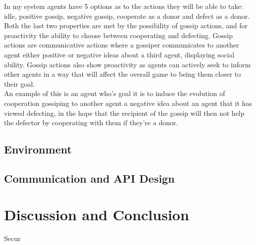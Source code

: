 \documentclass[twoside,twocolumn]{article}
\begin{document}
In my system agents have 5 options as to the actions they will be able to take: idle, positive gossip, negative gossip, cooperate as a donor and defect as a donor. Both the last two properties are met by the possibility of gossip actions, and for proactivity the ability to choose between cooperating and defecting. Gossip actions are communicative actions where a gossiper communicates to another agent either positive or negative ideas about a third agent, displaying social ability. Gossip actions also show proactivity as agents can actively seek to inform other agents in a way that will affect the overall game to being them closer to their goal.\\
An example of this is an agent who's goal it is to induce the evolution of cooperation gossiping to another agent a negative idea about an agent that it has viewed defecting, in the hope that the recipient of the gossip will then not help the defector by cooperating with them if they're a donor.

\subsection{Environment}


\subsection{Communication and API Design}



\section{Discussion and Conclusion}
Secur



{}


\end{document}
